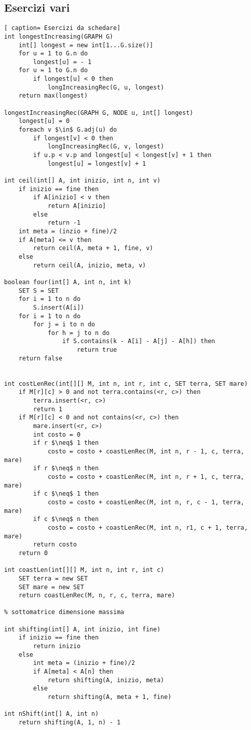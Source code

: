 \documentclass[../cheatSheetAlgoritmi.tex]{subfiles}
\begin{document}
\subsection{Esercizi vari}
\begin{lstlisting}[ caption= Esercizi da schedare]
int longestIncreasing(GRAPH G)
	int[] longest = new int[1...G.size()]
  	for u = 1 to G.n do
    	longest[u] = - 1
  	for u = 1 to G.n do
    	if longest[u] < 0 then
      		longIncreasingRec(G, u, longest)
  	return max(longest)

longestIncreasingRec(GRAPH G, NODE u, int[] longest)
	longest[u] = 0
  	foreach v $\in$ G.adj(u) do
    	if longest[v] < 0 then
      		longIncreasingRec(G, v, longest)
    	if u.p < v.p and longest[u] < longest[v] + 1 then
   			longest[u] = longest[v] + 1

int ceil(int[] A, int inizio, int n, int v)
	if inizio == fine then
    	if A[inizio] < v then
     		return A[inizio]
    	else
      		return -1
  	int meta = (inzio + fine)/2
  	if A[meta] <= v then
    	return ceil(A, meta + 1, fine, v)
  	else
    	return ceil(A, inizio, meta, v)

boolean four(int[] A, int n, int k) 
	SET S = SET
  	for i = 1 to n do 
    	S.insert(A[i])
  	for i = 1 to n do 
    	for j = i to n do 
      		for h = j to n do 
        		if S.contains(k - A[i] - A[j] - A[h]) then 
          			return true
  	return false
  

int costLenRec(int[][] M, int n, int r, int c, SET terra, SET mare)
	if M[r][c] > 0 and not terra.contains(<r, c>) then 
    	terra.insert(<r, c>)
    	return 1
  	if M[r][c] < 0 and not contains(<r, c>) then
    	mare.insert(<r, c>)
    	int costo = 0
    	if r $\neq$ 1 then
      		costo = costo + coastLenRec(M, int n, r - 1, c, terra, mare)
    	if r $\neq$ n then
      		costo = costo + coastLenRec(M, int n, r + 1, c, terra, mare)
    	if c $\neq$ 1 then
      		costo = costo + coastLenRec(M, int n, r, c - 1, terra, mare)
    	if c $\neq$ n then
      		costo = costo + coastLenRec(M, int n, r1, c + 1, terra, mare)
    	return costo
 	return 0

int coastLen(int[][] M, int n, int r, int c)
	SET terra = new SET
  	SET mare = new SET
  	return coastLenRec(M, n, r, c, terra, mare)
  
% sottomatrice dimensione massima

int shifting(int[] A, int inizio, int fine)
	if inizio == fine then
    	return inizio
  	else
    	int meta = (inizio + fine)/2
    	if A[meta] < A[n] then
      		return shifting(A, inizio, meta)
    	else
      		return shifting(A, meta + 1, fine)

int nShift(int[] A, int n)
	return shifting(A, 1, n) - 1
\end{lstlisting}
\end{document}
